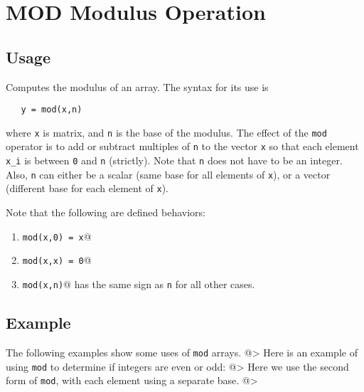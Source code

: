 \section{MOD Modulus Operation}

\subsection{Usage}

Computes the modulus of an array.  The syntax for its use is
\begin{verbatim}
   y = mod(x,n)
\end{verbatim}
where \verb|x| is matrix, and \verb|n| is the base of the modulus.  The
effect of the \verb|mod| operator is to add or subtract multiples of \verb|n|
to the vector \verb|x| so that each element \verb|x_i| is between \verb|0| and \verb|n|
(strictly).  Note that \verb|n| does not have to be an integer.  Also,
\verb|n| can either be a scalar (same base for all elements of \verb|x|), or a
vector (different base for each element of \verb|x|).

Note that the following are defined behaviors:
\begin{enumerate}
\item  \verb|mod(x,0) = x|@

\item  \verb|mod(x,x) = 0|@

\item  \verb|mod(x,n)|@ has the same sign as \verb|n| for all other cases.

\end{enumerate}
\subsection{Example}

The following examples show some uses of \verb|mod|
arrays.
@>
Here is an example of using \verb|mod| to determine if integers are even
 or odd:
@>
Here we use the second form of \verb|mod|, with each element using a 
separate base.
@>
